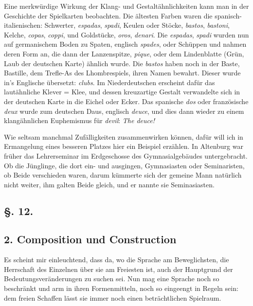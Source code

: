 {Eine merkwürdige Wirkung der Klang- und Gestaltähnlichkeiten kann man in der Geschichte der Spielkarten beobachten. Die ältesten Farben waren die spanisch-italienischen: Schwerter, \textit{espadas}, \textit{spadi}, Keulen oder Stöcke, \textit{bastos}, \textit{bastoni}, Kelche, \textit{copas}, \textit{coppi}, und Goldstücke, \textit{oros}, \textit{denari}. Die \textit{espadas}, \textit{spadi} wurden nun auf germanischem Boden zu Spaten, englisch \textit{spades}, oder Schüppen und nahmen deren Form an, die dann der Lanzenspitze, \textit{pique}, oder dem Linden\-\label{sp.234}blatte (Grün, Laub der deutschen Karte) ähnlich wurde. Die \textit{bastos} haben noch in der Baste, Bastille, dem Trefle-As des Lhombrespiels, ihren Namen bewahrt. Dieser \label{fp.232} wurde in’s Englische übersetzt: \textit{clubs}. Im Niederdeutschen erscheint dafür das lautähnliche Klever = Klee, und dessen kreuzartige Gestalt verwandelte sich in der deutschen Karte in die Eichel oder Ecker. Das spanische \textit{dos} oder französische \textit{deux} wurde zum deutschen Daus, englisch \textit{deuce}, und dies dann wieder zu einem klangähnlichen Euphemismus für \textit{devil}: \textit{The deuce!}

Wie seltsam manchmal Zufälligkeiten zusammenwirken können, dafür will ich in Ermangelung eines besseren Platzes hier ein Beispiel erzählen. In Altenburg war früher das Lehrerseminar im Erdgeschosse des Gymnasialgebäudes untergebracht. Ob die Jünglinge, die dort ein- und ausgingen, Gymnasiasten oder Seminaristen, ob Beide verschieden waren, darum kümmerte sich der gemeine Mann natürlich nicht weiter, ihm galten Beide gleich, und er nannte sie Seminasiasten.

\subsection*{§. 12.}
\subsection*{2. Composition und Construction}\label{III.II.II.12.2}
Es scheint mir einleuchtend, dass da, wo die Sprache am Beweglichsten, die Herrschaft des Einzelnen über sie am Freiesten ist, auch der Hauptgrund der Bedeutungsveränderungen zu suchen sei. Nun mag eine Sprache noch so beschränkt und arm in ihren Formenmitteln, noch so eingeengt in Regeln sein: dem freien Schaffen lässt sie immer noch einen beträchtlichen Spielraum.

}
